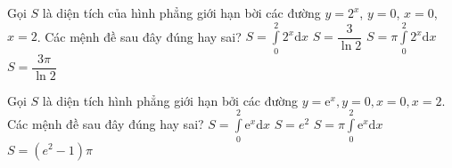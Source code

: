 \begin{ex}%
	Gọi $S$ là diện tích của hình phẳng giới hạn bời các đường $y=2^x$, $y=0$, $x=0$, $x=2$. Các mệnh đề sau đây đúng hay sai?
\choiceTF
{\True $S=\displaystyle\int\limits_0^2 2^x \mathrm{d}x$}
{\True $S=\dfrac{3}{\ln 2}$}
{$S=\pi \displaystyle\int\limits_0^2 2^x \mathrm{d}x$}
{$S=\dfrac{3 \pi}{\ln 2}$}
\loigiai{
\[
S=\displaystyle\int\limits_0^2\left|2^x\right| \mathrm{d}x=\displaystyle\int\limits_0^2 2^x \mathrm{d}x=\dfrac{2^2}{\ln 2}-\dfrac{2^0}{\ln 2}=\dfrac{3}{\ln 2}\left( \text {do } 2^x>0, \forall x \in[0;2]\right) .
\]
}
\end{ex}
\begin{ex}%
	Gọi $S$ là diện tích hình phẳng giới hạn bởi các đường $y=\mathrm{e}^x, y=0, x=0, x=2$. Các mệnh đề sau đây đúng hay sai?
\choiceTF
{\True $S=\displaystyle\int\limits_0^2 \mathrm{e}^x \mathrm{d}x$}
{$S=e^2$}
{$S=\pi \displaystyle\int\limits_0^2 \mathrm{e}^x \mathrm{d}x$}
{$S=\left(e^2-1\right) \pi$}
\end{ex}
